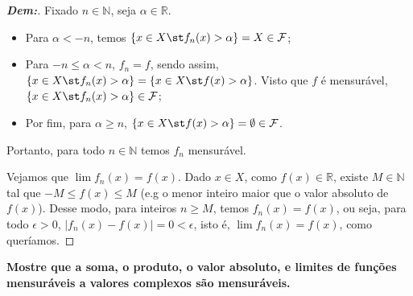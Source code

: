\begin{proof}[\textbf{Dem:}] Fixado $n \in \mathbb N$, seja $\alpha \in \mathbb R$. 

\begin{itemize}
  \item Para $\alpha < -n$, temos $\{x \in X\st  f_n(x) > \alpha\}
  = X \in \mathcal F$;
  \item   Para $-n \le \alpha < n$, $f_n = f$, sendo assim, $\{x \in X\st  f_n(x) > \alpha\} = 
    \{x \in X\st  f(x) > \alpha\}$. Visto que $f$ é mensurável, 
    $\{x \in X\st  f_n(x) > \alpha\} \in \mathcal F$;
  \item Por fim, para $\alpha \ge n$, $\{x \in X\st  f(x) > \alpha\} = \emptyset \in \mathcal F$.
\end{itemize}
Portanto, para todo $n \in \mathbb N$ temos $f_n$ mensurável. 

Vejamos que $\lim f_n(x) = f(x)$.
Dado $x \in X$, como $f(x) \in \mathbb R$, existe $M \in \mathbb N$ tal que $-M\le f(x)\le M$ 
(e.g o menor inteiro maior que o valor absoluto de $f(x)$).
Desse modo, para inteiros $n \ge M$, temos $f_n(x) = f(x)$, 
ou seja, para todo $\epsilon > 0$, $|f_n(x) - f(x)| = 0 < \epsilon$, 
isto é, $\lim f_n (x) = f(x)$, como queríamos.
\end{proof}
\biglinend
\newpage 
{}
\bigline 
\textbf{Mostre que a soma, o produto, o valor absoluto, e limites de funções mensuráveis
a valores complexos são mensuráveis.}
